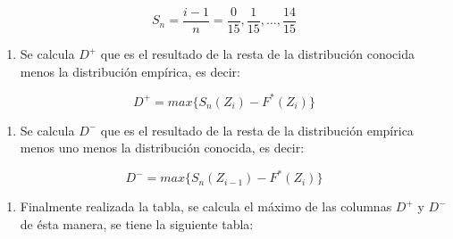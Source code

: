 \documentclass[a4paper,oneside,openany]{book}
\providecommand{\tightlist}{%
  \setlength{\itemsep}{0pt}\setlength{\parskip}{0pt}}
\begin{document}
\[S_{n}= \frac{i-1}{n}=\frac{0}{15},\frac{1}{15}, \ldots, \frac{14}{15} \]

\begin{enumerate}
\def\labelenumi{\arabic{enumi})}
\setcounter{enumi}{5}
\tightlist
\item
  Se calcula \(D^+\) que es el resultado de la resta de la distribución
  conocida menos la distribución empírica, es decir:
\end{enumerate}

\[D^+= max \{ S_{n}(Z_{i})-F^*(Z_{i})\}\]

\begin{enumerate}
\def\labelenumi{\arabic{enumi})}
\setcounter{enumi}{6}
\tightlist
\item
  Se calcula \(D^-\) que es el resultado de la resta de la distribución
  empírica menos uno menos la distribución conocida, es decir:
\end{enumerate}

\[D^-= max \{ S_{n}(Z_{i-1})-F^*(Z_{i})\}\]

\begin{enumerate}
\def\labelenumi{\arabic{enumi})}
\setcounter{enumi}{7}
\tightlist
\item
  Finalmente realizada la tabla, se calcula el máximo de las columnas
  \(D^+\) y \(D^-\) de ésta manera, se tiene la siguiente tabla:
\end{enumerate}
\end{document}
